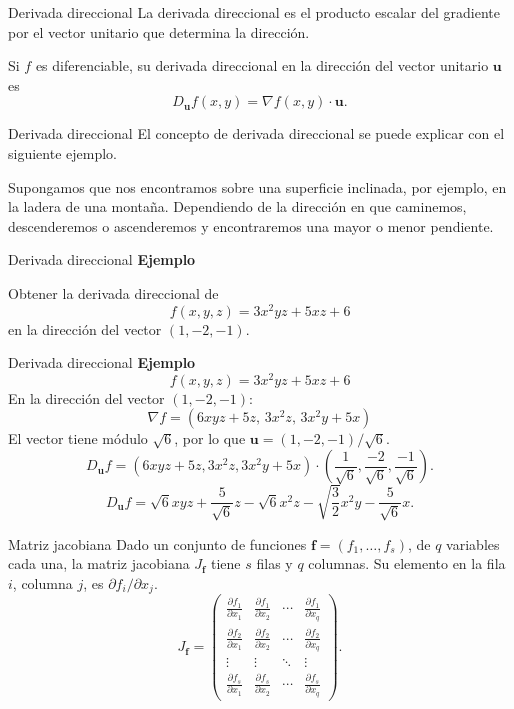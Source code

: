 \documentclass[main.tex]{subfiles}
\begin{document}
\begin{frame}{Derivada direccional}
La derivada direccional es el producto escalar del gradiente por el vector unitario que determina la dirección.
\medskip

Si $f$ es diferenciable, su derivada direccional en la dirección del vector unitario $\mathbf u$ es
\[D_{\mathbf u}f(x,y)=\nabla f(x,y)\cdot\mathbf u.\]
\end{frame}
\begin{frame}{Derivada direccional}
El concepto de derivada direccional se puede explicar con el siguiente ejemplo.
\medskip

Supongamos que nos encontramos sobre una superficie inclinada, por ejemplo, en la ladera de una montaña. Dependiendo de la dirección en que caminemos, descenderemos o ascenderemos y encontraremos una mayor o menor pendiente.
\end{frame}
\begin{frame}{Derivada direccional}
\textbf{Ejemplo}\par Obtener la derivada direccional de\[f(x,y,z)=3x^2yz+5xz+6\]
en la dirección del vector $(1,-2,-1)$.
\end{frame}
\begin{frame}{Derivada direccional}
\small\textbf{Ejemplo}\[f(x,y,z)=3x^2yz+5xz+6\]
En la dirección del vector $(1,-2,-1)$:
\[\nabla f=(6xyz+5z,\,3x^2z,\,3x^2y+5x)\]
El vector tiene módulo $\sqrt6$, por lo que $\mathbf u=(1,-2,-1)/\sqrt6$.
\[D_{\mathbf u}f=(6xyz+5z,3x^2z,3x^2y+5x)\cdot\left(\frac1{\sqrt6},\frac{-2}{\sqrt6},\frac{-1}{\sqrt6}\right).\]
\[D_{\mathbf u}f=\sqrt6xyz+\frac5{\sqrt6}z-\sqrt6x^2z-\sqrt{\frac32}x^2y-\frac5{\sqrt6}x.\]
\end{frame}
\begin{frame}{Matriz jacobiana}
\small Dado un conjunto de funciones $\mathbf f=(f_1,\ldots,f_s)$, de $q$ variables cada una, la matriz jacobiana $J_{\mathbf f}$ tiene $s$ filas y $q$ columnas. Su elemento en la fila $i$, columna $j$, es $\partial f_i/\partial x_j$.
\[J_{\mathbf f}=\begin{pmatrix}
\frac{\partial f_1}{\partial x_1}&\frac{\partial f_1}{\partial x_2}&\cdots&\frac{\partial f_1}{\partial x_q}\\
\frac{\partial f_2}{\partial x_1}&\frac{\partial f_2}{\partial x_2}&\cdots&\frac{\partial f_2}{\partial x_q}\\
\vdots&\vdots&\ddots&\vdots\\
\frac{\partial f_s}{\partial x_1}&\frac{\partial f_s}{\partial x_2}&\cdots&\frac{\partial f_s}{\partial x_q}
\end{pmatrix}.\]
\end{frame}
\end{document}
